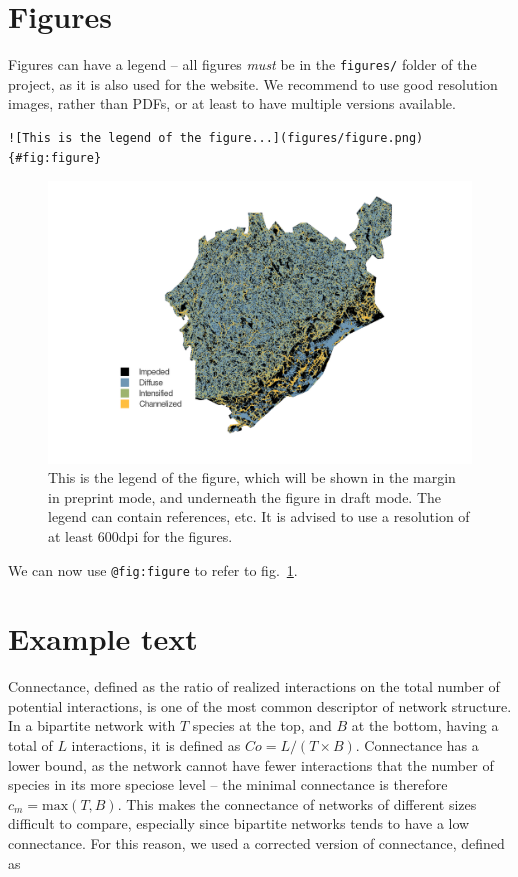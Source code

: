 \documentclass[11pt]{article}
\makeatletter
\def\maxwidth{\ifdim\Gin@nat@width>\linewidth\linewidth
\else\Gin@nat@width\fi}
\let\Oldincludegraphics\includegraphics
\renewcommand{\includegraphics}[1]{\Oldincludegraphics[width=\maxwidth]{#1}}
\makeatother
\begin{document}
\hypertarget{figures}{%
\section{Figures}\label{figures}}

Figures can have a legend -- all figures \emph{must} be in the
\texttt{figures/} folder of the project, as it is also used for the
website. We recommend to use good resolution images, rather than PDFs,
or at least to have multiple versions available.

\begin{verbatim}
![This is the legend of the figure...](figures/figure.png){#fig:figure}
\end{verbatim}

\begin{figure}
\hypertarget{fig:figure}{%
\centering
\includegraphics{figures/figure.png}
\caption{This is the legend of the figure, which will be shown in the
margin in preprint mode, and underneath the figure in draft mode. The
legend can contain references, etc. It is advised to use a resolution of
at least 600dpi for the figures.}\label{fig:figure}
}
\end{figure}

We can now use \texttt{@fig:figure} to refer to fig.~\ref{fig:figure}.

\hypertarget{example-text}{%
\section{Example text}\label{example-text}}

Connectance, defined as the ratio of realized interactions on the total
number of potential interactions, is one of the most common descriptor
of network structure. In a bipartite network with \(T\) species at the
top, and \(B\) at the bottom, having a total of \(L\) interactions, it
is defined as \(Co = L/(T\times B)\). Connectance has a lower bound, as
the network cannot have fewer interactions that the number of species in
its more speciose level -- the minimal connectance is therefore
\(c_m = \text{max}(T,B)\). This makes the connectance of networks of
different sizes difficult to compare, especially since bipartite
networks tends to have a low connectance. For this reason, we used a
corrected version of connectance, defined as
\end{document}
